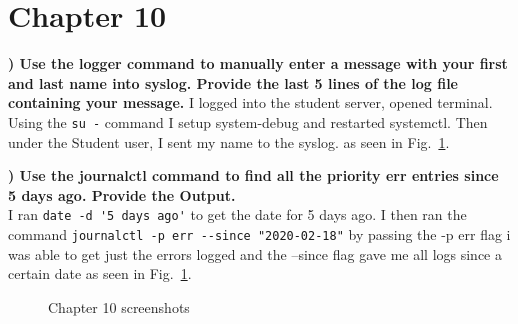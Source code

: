 \documentclass{report}
\title{\classinfo}
\author{\semester}
\date{\today}
\newcommand{\mysection}[1]{\section*{#1}}
\newcommand{\mysubsection}[2]{\textbf{\romannumeral #1) #2}}
\begin{document}
\maketitle

\mysection{\textbf{Chapter 10}}

\mysubsection{1}{Use the logger command to manually enter a message with your 
first and last name into syslog. Provide the last 5 lines of the log file 
containing your message.}
I logged into the student server, opened terminal. Using
the {\scriptsize{\verb$su -$}\normalsize} command I setup system-debug and
restarted systemctl. Then under the Student user, I sent my name to the syslog.
as seen in Fig.~\ref{Ch10}.


\noindent\mysubsection{2}{Use the journalctl command to find all the priority err entries since 5 days ago. Provide the Output.}
\\I ran {\scriptsize{\verb$date -d '5 days ago'$}\normalsize} to
get the date for 5 days ago. I then ran the 
command {\scriptsize{\verb$journalctl -p err --since "2020-02-18"$}\normalsize} 
by passing the -p err flag i was able to get just the errors logged  and the
--since flag gave me all logs since a certain date 
as seen in Fig.~\ref{Ch10}.


\begin{figure}[!b]\centering
{}\par
{}\par
\caption{Chapter 10 screenshots}
\label{Ch10}
\end{figure}
\end{document}
